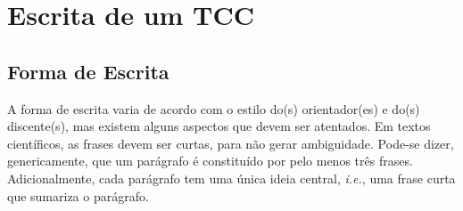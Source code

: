 \documentclass{eic-bcc-tcc}
\begin{document}
\begin{abstract}
Mandatory element, consting of a sequence of concise and objective sentences, providing a quick and clear overview of the study's content. The text must contain a maximum of 500 words and be preceded by the study's reference. It should not include citations and must be written as a single paragraph.
A good abstract presents the following elements:
\textbf{Contextualization:} describes the context of the study being presented;
\textbf{Gap:} indicates what is not yet covered in the literature;
\textbf{Objective:} states the purpose of the study; 
\textbf{Methodology:} explains how the study intends to achieve its objective; and
\textbf{Results:} summarizes the main findings to encourage reading of the full work, followed by the main conclusions.
Below the abstract, keywords are provided to identify the study, allowing for indexing classification and facilitating its retrieval through appropriate search mechanisms. The most representative words related to the content of the work should be used. Three to five keywords must be provided, separated by periods and ending with a period as well.

\end{abstract}

\listoffigurespage

\listoftablespage

\listofacronymspage

\tableofcontentspage

\mainmatter


\chapter{Escrita de um TCC}

\section{Forma de Escrita}

A forma de escrita varia de acordo com o estilo do(s) orientador(es) e do(s) discente(s), mas existem alguns aspectos que devem ser atentados. Em textos científicos, as frases devem ser curtas, para não gerar ambiguidade. Pode-se dizer, genericamente, que um parágrafo é constituído por pelo menos três frases. Adicionalmente, cada parágrafo tem uma única ideia central, \textit{i.e.}, uma frase curta que sumariza o parágrafo.
\end{document}
